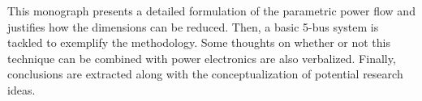 This monograph presents a detailed formulation of the parametric power flow and justifies how the dimensions can be reduced. Then, a basic 5-bus system is tackled to exemplify the methodology. Some thoughts on whether or not this technique can be combined with power electronics are also verbalized. Finally, conclusions are extracted along with the conceptualization of potential research ideas. 
